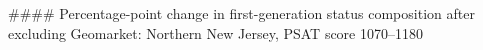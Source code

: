 #### Percentage-point change in first-generation status composition after excluding Geomarket: Northern New Jersey, PSAT score 1070–1180
